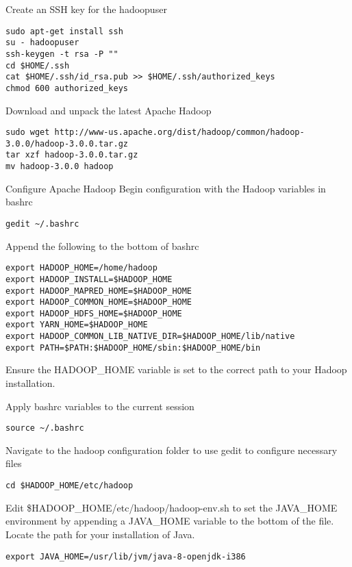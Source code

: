 Create an SSH key for the hadoopuser

\begin{lstlisting}
sudo apt-get install ssh
su - hadoopuser
ssh-keygen -t rsa -P ""
cd $HOME/.ssh
cat $HOME/.ssh/id_rsa.pub >> $HOME/.ssh/authorized_keys
chmod 600 authorized_keys
\end{lstlisting}

Download and unpack the latest Apache Hadoop

\begin{lstlisting}
sudo wget http://www-us.apache.org/dist/hadoop/common/hadoop-3.0.0/hadoop-3.0.0.tar.gz
tar xzf hadoop-3.0.0.tar.gz
mv hadoop-3.0.0 hadoop
\end{lstlisting}

Configure Apache Hadoop Begin configuration with the Hadoop variables in
bashrc

\begin{lstlisting}
gedit ~/.bashrc
\end{lstlisting}

Append the following to the bottom of bashrc

\begin{lstlisting}
export HADOOP_HOME=/home/hadoop
export HADOOP_INSTALL=$HADOOP_HOME
export HADOOP_MAPRED_HOME=$HADOOP_HOME
export HADOOP_COMMON_HOME=$HADOOP_HOME
export HADOOP_HDFS_HOME=$HADOOP_HOME
export YARN_HOME=$HADOOP_HOME
export HADOOP_COMMON_LIB_NATIVE_DIR=$HADOOP_HOME/lib/native
export PATH=$PATH:$HADOOP_HOME/sbin:$HADOOP_HOME/bin
\end{lstlisting}

Ensure the HADOOP\_HOME variable is set to the correct path to your
Hadoop installation.

Apply bashrc variables to the current session

\begin{lstlisting}
source ~/.bashrc
\end{lstlisting}

Navigate to the hadoop configuration folder to use gedit to configure
necessary files

\begin{lstlisting}
cd $HADOOP_HOME/etc/hadoop
\end{lstlisting}

Edit \$HADOOP\_HOME/etc/hadoop/hadoop-env.sh to set the JAVA\_HOME
environment by appending a JAVA\_HOME variable to the bottom of the
file. Locate the path for your installation of Java.

\begin{lstlisting}
export JAVA_HOME=/usr/lib/jvm/java-8-openjdk-i386
\end{lstlisting}

